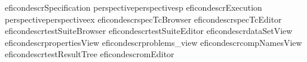 
\begin{gdreficon}
  \jb{}eficondescr{Specification perspective}{perspectivesp}
  \jb{}eficondescr{Execution perspective}{perspectiveex}
  \jb{}eficondescr{\gdtestcasebrowser}{specTcBrowser}
  \jb{}eficondescr{\gdtestcaseeditor}{specTcEditor}
  \jb{}eficondescr{\gdtestsuitebrowser}{testSuiteBrowser}
  \jb{}eficondescr{\gdtestsuiteeditor}{testSuiteEditor}
  \jb{}eficondescr{\gddatasetsview}{dataSetView}
  \jb{}eficondescr{\gdpropview}{propertiesView}
  \jb{}eficondescr{\gdprobview}{problems_view}
  \jb{}eficondescr{\gdcompnamesview}{compNamesView}
  \jb{}eficondescr{\gdtestresultview}{testResultTree}
  \jb{}eficondescr{\gdomeditor}{omEditor}
\end{gdreficon}




